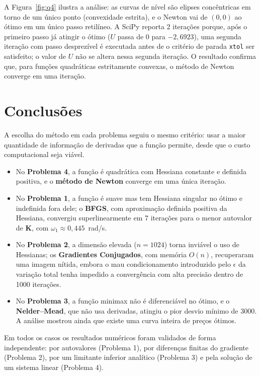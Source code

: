 \documentclass[12pt,a4paper]{article}
\begin{document}
A Figura~\ref{fig:q4} ilustra a análise: as curvas de nível são elipses concêntricas em torno de um único ponto (convexidade estrita), e o Newton vai de $(0,0)$ ao ótimo em um único passo retilíneo. A SciPy reporta 2 iterações porque, após o primeiro passo já atingir o ótimo ($U$ passa de $0$ para $-2{,}6923$), uma segunda iteração com passo desprezível é executada antes de o critério de parada \texttt{xtol} ser satisfeito; o valor de $U$ não se altera nessa segunda iteração. O resultado confirma que, para funções quadráticas estritamente convexas, o método de Newton converge em uma iteração.

\section*{Conclusões}

A escolha do método em cada problema seguiu o mesmo critério: usar a maior quantidade de informação de derivadas que a função permite, desde que o custo computacional seja viável.

\begin{itemize}
  \item No \textbf{Problema 4}, a função é quadrática com Hessiana constante e definida positiva, e o \textbf{método de Newton} converge em uma única iteração.
  \item No \textbf{Problema 1}, a função é suave mas tem Hessiana singular no ótimo e indefinida fora dele; o \textbf{BFGS}, com aproximação definida positiva da Hessiana, convergiu superlinearmente em 7 iterações para o menor autovalor de $\mathbf{K}$, com $\omega_1\approx0{,}445$~rad/s.
  \item No \textbf{Problema 2}, a dimensão elevada ($n=1024$) torna inviável o uso de Hessianas; os \textbf{Gradientes Conjugados}, com memória $O(n)$, recuperaram uma imagem nítida, embora o mau condicionamento introduzido pelo $\epsilon$ da variação total tenha impedido a convergência com alta precisão dentro de 1000 iterações.
  \item No \textbf{Problema 3}, a função minimax não é diferenciável no ótimo, e o \textbf{Nelder--Mead}, que não usa derivadas, atingiu o pior desvio mínimo de 3000. A análise mostrou ainda que existe uma curva inteira de preços ótimos.
\end{itemize}

Em todos os casos os resultados numéricos foram validados de forma independente: por autovalores (Problema 1), por diferenças finitas do gradiente (Problema 2), por um limitante inferior analítico (Problema 3) e pela solução de um sistema linear (Problema 4).
\end{document}
